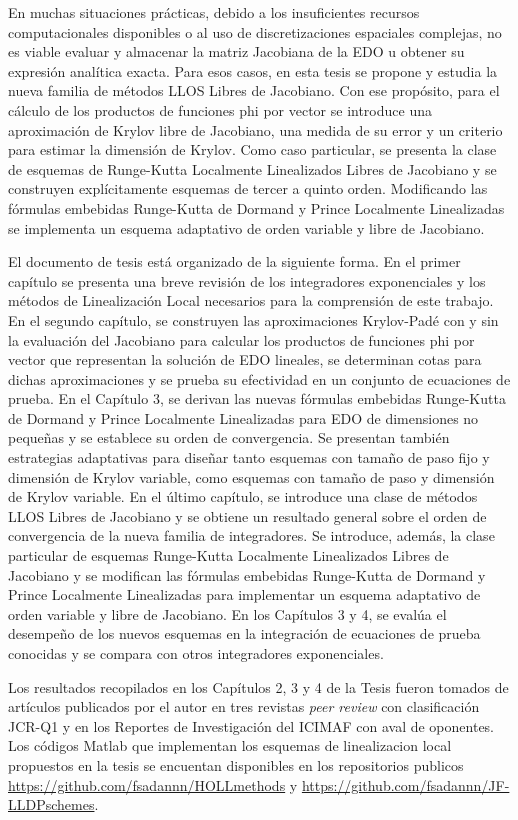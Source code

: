 En muchas situaciones prácticas, debido a los insuficientes recursos computacionales disponibles o al uso de discretizaciones espaciales complejas, no es viable evaluar y almacenar la matriz Jacobiana de la EDO u obtener su expresión analítica exacta. Para esos casos, en esta tesis se propone y estudia la nueva familia de métodos LLOS Libres de Jacobiano. Con ese propósito, para el cálculo de los productos de funciones phi por vector se introduce una aproximación de Krylov libre de Jacobiano, una medida de su error y un criterio para estimar la dimensión de Krylov. Como caso particular, se presenta la clase de esquemas de Runge-Kutta Localmente Linealizados Libres de Jacobiano y se construyen explícitamente esquemas de tercer a quinto orden. Modificando las fórmulas embebidas  Runge-Kutta de Dormand y Prince Localmente Linealizadas se implementa un esquema adaptativo de orden variable y libre de Jacobiano.

El documento de tesis está organizado de la siguiente forma. En el primer capítulo se presenta una breve revisión de los integradores exponenciales y los métodos de Linealización Local necesarios para la comprensión de este trabajo. En el segundo capítulo, se construyen las aproximaciones Krylov-Padé con y sin la evaluación del Jacobiano para calcular los productos de funciones phi por vector que representan la solución de EDO lineales, se determinan cotas para dichas aproximaciones y se prueba su efectividad en un conjunto de ecuaciones de prueba. En el Capítulo 3, se derivan las nuevas fórmulas embebidas Runge-Kutta de Dormand y Prince Localmente Linealizadas para EDO de dimensiones no pequeñas y se establece su orden de convergencia. Se presentan también estrategias adaptativas para diseñar tanto esquemas con tamaño de paso fijo y dimensión de Krylov variable, como esquemas con tamaño de paso y dimensión de Krylov variable. En el último capítulo, se introduce una clase de métodos LLOS Libres de Jacobiano y se obtiene un resultado general sobre el orden de convergencia de la nueva familia de integradores. Se introduce, además, la clase particular de esquemas Runge-Kutta Localmente Linealizados Libres de Jacobiano y se modifican las fórmulas embebidas Runge-Kutta  de Dormand y Prince Localmente Linealizadas para implementar un esquema adaptativo de orden variable y libre de Jacobiano.
En los Capítulos 3 y 4, se evalúa el desempeño de los nuevos esquemas en la integración de ecuaciones de prueba conocidas y se compara con otros integradores exponenciales.

Los resultados recopilados en los Capítulos 2, 3 y 4 de la Tesis fueron tomados de artículos \cite{naranjo2021locally,naranjo2023jacobian,naranjo2023computing} publicados por el autor en tres revistas \textit{peer review} con clasificación JCR-Q1 y en los Reportes de Investigación del ICIMAF \cite{naranjo2022RT,naranjo2023RT} con aval de oponentes. Los códigos Matlab que implementan los esquemas de linealizacion local propuestos en la tesis se encuentan disponibles en los repositorios publicos \url{https://github.com/fsadannn/HOLLmethods} y
\url{https://github.com/fsadannn/JF-LLDPschemes}.

